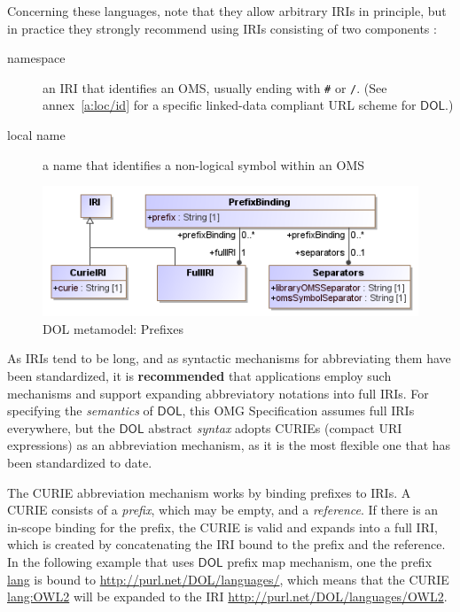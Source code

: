 \documentclass[10pt, a4paper]{isov2}
\newcommand*{\syntax}[1]{\texttt{#1}}
\newcommand*{\recommended}{\textbf{recommended}\xspace}
\newcommand*{\IS}{OMG Specification\xspace}
\newcommand*{\DOL}{\ensuremath{\mathsf{DOL}}\xspace}
\begin{document}
Concerning these languages, note that they allow arbitrary IRIs in principle, but in practice they 
strongly recommend using IRIs consisting of two components \cite{W3C:NOTE-swbp-vocab-pub-20080828}:
 \begin{description} 
\item[namespace] an IRI that identifies an OMS,
usually ending with \syntax{\#} or \syntax{/}. ({See annex~\ref{a:loc/id} for a specific linked-data compliant URL scheme for \DOL.})
\item[local name] a name that identifies a non-logical symbol within an OMS
 \end{description} 

\medskip
\begin{figure}
  \centering
    \includegraphics[scale=0.47]{mof/prefixes.png}
  \caption{DOL metamodel: Prefixes}
  \label{fig:prefixes}
\end{figure}


\label{c:curies}

As IRIs tend to be long, and as syntactic mechanisms for abbreviating them have been standardized, 
it is \recommended that applications employ such mechanisms and support expanding abbreviatory
notations into full IRIs.  For specifying the \emph{semantics} of \DOL, this \IS assumes full IRIs 
everywhere, but the \DOL abstract \emph{syntax} adopts CURIEs (compact URI expressions) as an 
abbreviation mechanism, as it is the most flexible one that has been standardized to date.  

The CURIE abbreviation mechanism works by binding prefixes to IRIs.  A CURIE consists of a 
\emph{prefix}, which may be empty, and a \emph{reference}.  If there is an in-scope binding for the 
prefix, the CURIE is valid and expands into a full IRI, which is created by concatenating the IRI 
bound to the prefix and the reference.  In the following example that uses \DOL prefix map mechanism, one the prefix \url{lang} is bound to \url{http://purl.net/DOL/languages/}, which
means that the CURIE \url{lang:OWL2} will be expanded to the IRI
\url{http://purl.net/DOL/languages/OWL2}. 
\end{document}
